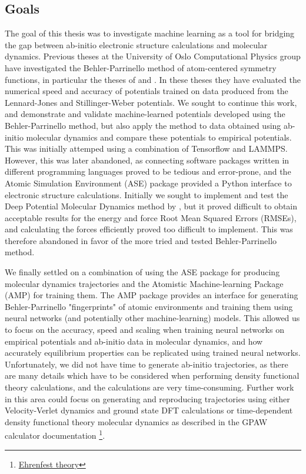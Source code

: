 \subsection{Goals}
The goal of this thesis was to investigate machine learning
as a tool for bridging the gap between ab-initio electronic structure
calculations and molecular dynamics. Previous theses at the University
of Oslo Computational Physics group have investigated the Behler-Parrinello
method of atom-centered symmetry functions, in particular the theses of
\parencite[Stende, John A,]{stende2017constructing} and
\parencite[Treider, H{\aa}kon Vik{\o}r]{treider2017speeding}.
In these theses they have evaluated the
numerical speed and accuracy of potentials trained on data
produced from the Lennard-Jones
and Stillinger-Weber potentials.
We sought to continue this work, and demonstrate and validate machine-learned
potentials developed using the Behler-Parrinello method, but also apply
the method to data obtained using ab-initio molecular dynamics
and compare these potentials to empirical potentials.
This was initially attemped using a combination of Tensorflow and LAMMPS.
However, this was later abandoned, as connecting software packages written
in different programming languages proved to be tedious and error-prone,
and the Atomic Simulation Environment (ASE) package provided a Python interface to
electronic structure calculations.
Initially we sought to implement and test the Deep Potential Molecular Dynamics
method by \parencite[Zhang et al.]{PhysRevLett.120.143001}, but
it proved difficult to obtain acceptable results for the energy
and force Root Mean Squared Errors (RMSEs), and calculating the forces
efficiently proved too difficult to implement. This was therefore abandoned
in favor of the more tried and tested Behler-Parrinello method.
\par
We finally settled on a combination of using the ASE package for producing
molecular dynamics trajectories and the Atomistic Machine-learning Package
(AMP) for training them. The AMP package provides an interface
for generating Behler-Parrinello "fingerprints" of atomic environments
and training them using neural networks (and potentially other machine-learning)
models. This allowed us to focus on the accuracy, speed and scaling
when training neural networks on empirical potentials and ab-initio
data in molecular dynamics, and how accurately equilibrium properties
can be replicated using trained neural networks.
Unfortunately, we did not have time to generate ab-initio trajectories,
as there are many details which have to be considered when performing
density functional theory calculations, and the calculations are very
time-consuming. Further work in this area could focus on generating
and reproducing trajectories using either Velocity-Verlet dynamics
and ground state DFT calculations or time-dependent density functional
theory molecular dynamics as described in the GPAW calculator documentation
\footnote{\href{https://wiki.fysik.dtu.dk/gpaw/documentation/ehrenfest/ehrenfest_theory
.html}{Ehrenfest theory}}.

